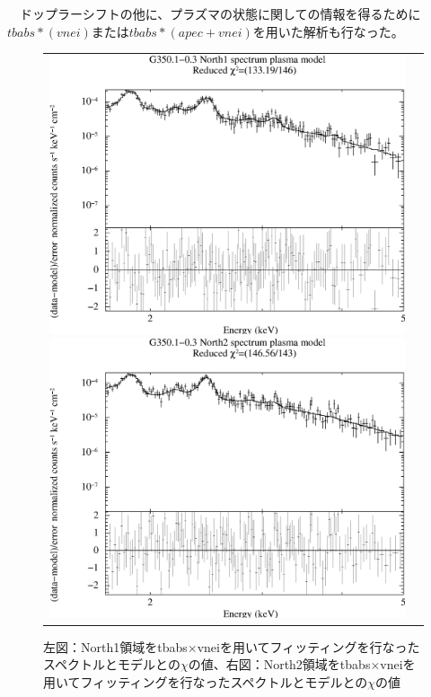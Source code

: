 \documentclass[a4j]{jarticle}%
\begin{document}
~~ドップラーシフトの他に、プラズマの状態に関しての情報を得るために$tbabs*(vnei)$または$tbabs*(apec+vnei)$を用いた解析も行なった。

\begin{figure}[H]
\begin{center}
\begin{tabular}{cc}
\begin{minipage}{0.5\hsize}
\begin{center}
\includegraphics[scale=0.30]{./ps/North1_plasma.eps}
\end{center}
\end{minipage}
\begin{minipage}{0.5\hsize}
\begin{center}
\includegraphics[scale=0.30]{./ps/North2_plasma.eps}
\end{center}
\end{minipage}
\end{tabular}
\caption{左図：North1領域をtbabs$\times$vneiを用いてフィッティングを行なったスペクトルとモデルとの$\chi$の値、右図：North2領域をtbabs$\times$vneiを用いてフィッティングを行なったスペクトルとモデルとの$\chi$の値}
\label{fig:plasma_North}
\end{center}
\end{figure}
\end{document}
